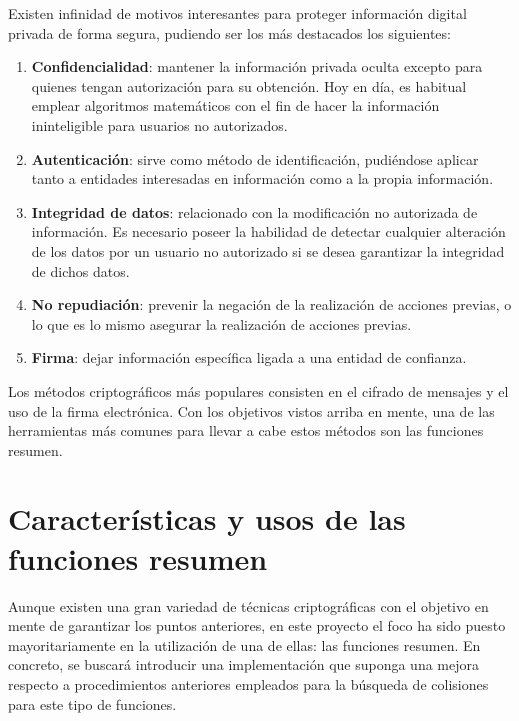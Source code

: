 \documentclass[12pt,spanish,listoffigures,listoftables,listofalgorithms]{tfgetsinf}
\begin{document}
Existen infinidad de motivos interesantes para proteger información digital privada de forma segura, pudiendo ser los más destacados los siguientes:

\begin{enumerate}
	
	\item \textbf{Confidencialidad}: mantener la información privada oculta excepto para quienes tengan autorización para su obtención. Hoy en día, es habitual emplear algoritmos matemáticos con el fin de hacer la información ininteligible para usuarios no autorizados.
	
	\item \textbf{Autenticación}: sirve como método de identificación, pudiéndose aplicar tanto a entidades interesadas en información como a la propia información.

	\item \textbf{Integridad de datos}: relacionado con la modificación no autorizada de información. Es necesario poseer la habilidad de detectar cualquier alteración de los datos por un usuario no autorizado si se desea garantizar la integridad de dichos datos.

	\item \textbf{No repudiación}: prevenir la negación de la realización de acciones previas, o lo que es lo mismo asegurar la realización de acciones previas.

	\item \textbf{Firma}: dejar información específica ligada a una entidad de confianza.

\end{enumerate}

Los métodos criptográficos más populares consisten en el cifrado de mensajes y el uso de la firma electrónica. Con los objetivos vistos arriba en mente, una de las herramientas más comunes para llevar a cabe estos métodos son las funciones resumen.

\section{Características y usos de las funciones resumen}

Aunque existen una gran variedad de técnicas criptográficas con el objetivo en mente de garantizar los puntos anteriores, en este proyecto el foco ha sido puesto mayoritariamente en la utilización de una de ellas: las funciones resumen. En concreto, se buscará introducir una implementación que suponga una mejora respecto a procedimientos anteriores empleados para la búsqueda de colisiones para este tipo de funciones.
\end{document}
